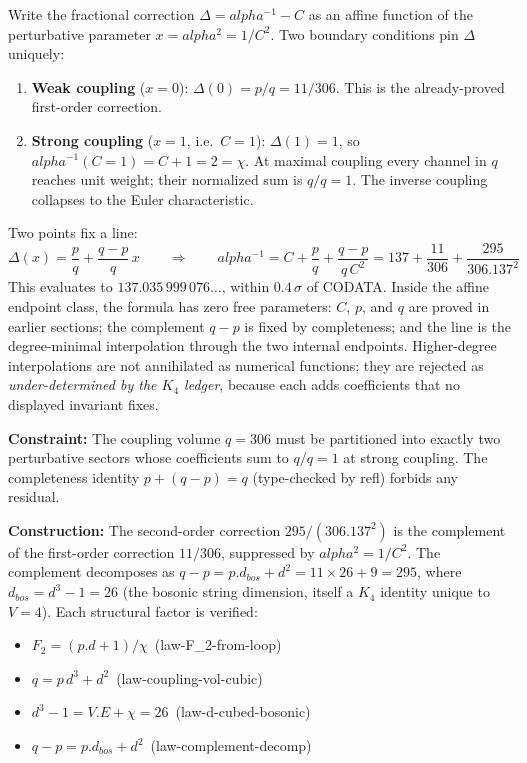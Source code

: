 \documentclass[11pt,a4paper]{book}
\def\alpha{alpha}%
\def\cdot{.}%
\def\mathrm#1{#1}%
\def\texttt#1{#1}%
\def\ensuremath#1{#1}%
\begin{document}
Write the fractional correction $\Delta = \alpha^{-1} - C$ as an affine function of the
perturbative parameter $x = \alpha^2 = 1/C^2$.  Two boundary conditions pin $\Delta$
uniquely:
%
\begin{enumerate}
\item \textbf{Weak coupling} ($x = 0$): $\Delta(0) = p/q = 11/306$.  This is the
  already-proved first-order correction.
\item \textbf{Strong coupling} ($x = 1$, i.e.\ $C = 1$):
  $\Delta(1) = 1$, so $\alpha^{-1}(C=1) = C + 1 = 2 = \chi$.
  At maximal coupling every channel in $q$ reaches unit weight; their normalized
  sum is $q/q = 1$.  The inverse coupling collapses to the Euler characteristic.
\end{enumerate}
%
Two points fix a line:
\[
  \Delta(x) = \frac{p}{q} + \frac{q-p}{q}\,x
  \qquad\Longrightarrow\qquad
  \alpha^{-1} = C + \frac{p}{q} + \frac{q-p}{q\,C^2}
  = 137 + \frac{11}{306} + \frac{295}{306 \cdot 137^2}
\]
This evaluates to $137.035\,999\,076\ldots$, within $0.4\,\sigma$ of
CODATA.  Inside the affine endpoint class, the formula has zero free
parameters: $C$, $p$, and $q$ are proved in earlier sections; the complement
$q - p$ is fixed by completeness; and the line is the degree-minimal
interpolation through the two internal endpoints.  Higher-degree
interpolations are not annihilated as numerical functions; they are rejected
as
\emph{under-determined by the $K_4$ ledger}, because each adds coefficients
that no displayed invariant fixes.

\medskip
\noindent
\textbf{Constraint:}
The coupling volume $q = 306$ must be partitioned into exactly two
perturbative sectors whose coefficients sum to $q/q = 1$ at strong coupling.
The completeness identity $p + (q-p) = q$ (type-checked by \texttt{refl})
forbids any residual.

\medskip
\noindent
\textbf{Construction:}
The second-order correction $295/(306 \cdot 137^2)$ is the complement of the
first-order correction $11/306$, suppressed by $\alpha^2 = 1/C^2$.  The
complement decomposes as $q - p = p \cdot d_{\mathrm{bos}} + d^2 =
11 \times 26 + 9 = 295$, where $d_{\mathrm{bos}} = d^3 - 1 = 26$
(the bosonic string dimension, itself a $K_4$ identity unique to $V = 4$).
Each structural factor is verified:
\begin{itemize}
\item $F_2 = (p \cdot d + 1)/\chi$\, (\texttt{law-F\ensuremath{_2}-from-loop})
\item $q = p\,d^3 + d^2$\, (\texttt{law-coupling-vol-cubic})
\item $d^3 - 1 = V \cdot E + \chi = 26$\,
  (\texttt{law-d-cubed-bosonic})
\item $q - p = p \cdot d_{\mathrm{bos}} + d^2$\,
  (\texttt{law-complement-decomp})
\end{itemize}
\end{document}
